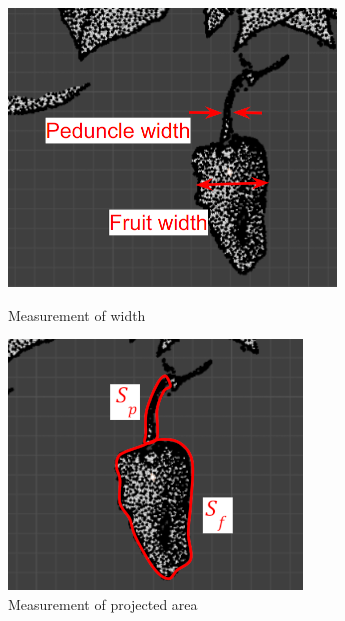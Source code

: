 \begin{figure}[H]
  \begin{minipage}[b]{0.48\columnwidth}
    \centering
    \includegraphics[width=\columnwidth]{images/png/measurement2.png}
    \caption{Measurement of width}
    \label{Fig:measurement2}
  \end{minipage}
  \hspace{0.04\columnwidth}
  \begin{minipage}[b]{0.48\columnwidth}
    \centering
    \includegraphics[width=\columnwidth]{images/png/measurement3.png}
    \caption{Measurement of projected area}
    \label{Fig:measurement3}
  \end{minipage}
\end{figure}